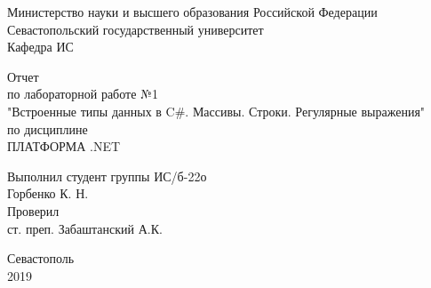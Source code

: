 \documentclass[a4paper,14pt]{extarticle}
\newcommand{\mylabnumber}{1}
\newcommand{\mylabtitle}{Встроенные типы данных в C\#. Массивы. Строки. Регулярные выражения}
\newcommand{\mysubject}{Платформа .NET}
\newcommand{\mylecturer}{ст. преп. Забаштанский А.К.}
\begin{document}

    \begin{titlepage}
        
        \thispagestyle{empty}
        
        \begin{center}
            
            Министерство науки и высшего образования Российской Федерации \\
            Севастопольский государственный университет \\
            Кафедра ИС
            
            \vfill
            \large{
                Отчет \\
                по лабораторной работе №\mylabnumber \\
                "\mylabtitle" \\
                по дисциплине \\
                \MakeTextUppercase{\mysubject}
            }

        \end{center}

        \vspace{1cm}

        \noindent\hspace{7.5cm} Выполнил студент группы ИС/б-22о \\
        \null\hspace{7.5cm} Горбенко К. Н. \\
        \null\hspace{7.5cm} Проверил \\
        \null\hspace{7.5cm} \mylecturer

        \vfill

        \begin{center}
            Севастополь \\
            2019
        \end{center}

    \end{titlepage}

\end{document}
